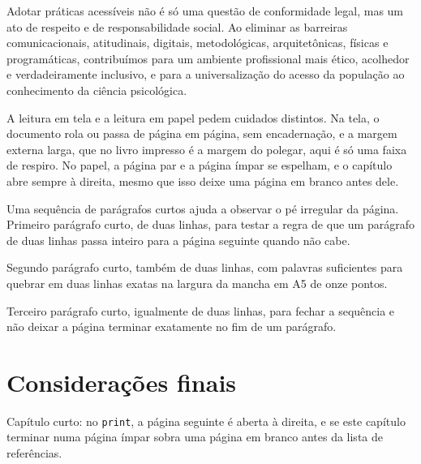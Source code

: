 Adotar práticas acessíveis não é só uma questão de conformidade legal, mas um
ato de respeito e de responsabilidade social. Ao eliminar as barreiras
comunicacionais, atitudinais, digitais, metodológicas, arquitetônicas, físicas e
programáticas, contribuímos para um ambiente profissional mais ético,
acolhedor e verdadeiramente inclusivo, e para a universalização do acesso da
população ao conhecimento da ciência psicológica.

A leitura em tela e a leitura em papel pedem cuidados distintos. Na tela, o
documento rola ou passa de página em página, sem encadernação, e a margem externa
larga, que no livro impresso é a margem do polegar, aqui é só uma faixa de
respiro. No papel, a página par e a página ímpar se espelham, e o capítulo abre
sempre à direita, mesmo que isso deixe uma página em branco antes dele.

Uma sequência de parágrafos curtos ajuda a observar o pé irregular da página.
Primeiro parágrafo curto, de duas linhas, para testar a regra de que um
parágrafo de duas linhas passa inteiro para a página seguinte quando não cabe.

Segundo parágrafo curto, também de duas linhas, com palavras suficientes para
quebrar em duas linhas exatas na largura da mancha em A5 de onze pontos.

Terceiro parágrafo curto, igualmente de duas linhas, para fechar a sequência e
não deixar a página terminar exatamente no fim de um parágrafo.

\chapter{Considerações finais}

Capítulo curto: no \texttt{print}, a página seguinte é aberta à direita, e se
este capítulo terminar numa página ímpar sobra uma página em branco antes da
lista de referências.
